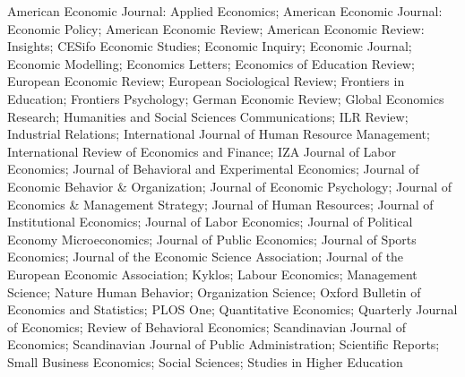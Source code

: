 American Economic Journal: Applied Economics; American Economic Journal: Economic Policy; American Economic Review; American Economic Review: Insights; CESifo Economic Studies; Economic Inquiry; Economic Journal; Economic Modelling; Economics Letters; Economics of Education Review; European Economic Review; European Sociological Review; Frontiers in Education; Frontiers Psychology; German Economic Review; Global Economics Research; Humanities and Social Sciences Communications; ILR Review; Industrial Relations; International Journal of Human Resource Management; International Review of Economics and Finance; IZA Journal of Labor Economics; Journal of Behavioral and Experimental Economics; Journal of Economic Behavior \& Organization; Journal of Economic Psychology; Journal of Economics \& Management Strategy; Journal of Human Resources; Journal of Institutional Economics; Journal of Labor Economics; Journal of Political Economy Microeconomics; Journal of Public Economics; Journal of Sports Economics; Journal of the Economic Science Association; Journal of the European Economic Association; Kyklos; Labour Economics; Management Science; Nature Human Behavior; Organization Science; Oxford Bulletin of Economics and Statistics; PLOS One; Quantitative Economics; Quarterly Journal of Economics; Review of Behavioral Economics; Scandinavian Journal of Economics; Scandinavian Journal of Public Administration; Scientific Reports; Small Business Economics; Social Sciences; Studies in Higher Education%
